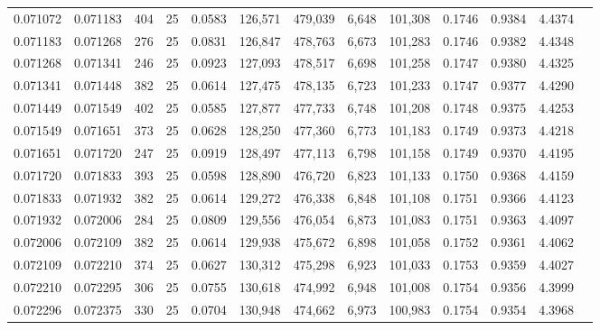 \begin{tabular}{rrrrrrrrrrrrr}
0.071072 & 0.071183 &   404 &  25 &                                     0.0583 & 126,571 & 479,039 &   6,648 & 101,308 & 0.1746 & 0.9384 & 4.4374 \\
0.071183 & 0.071268 &   276 &  25 &                                     0.0831 & 126,847 & 478,763 &   6,673 & 101,283 & 0.1746 & 0.9382 & 4.4348 \\
0.071268 & 0.071341 &   246 &  25 &                                     0.0923 & 127,093 & 478,517 &   6,698 & 101,258 & 0.1747 & 0.9380 & 4.4325 \\
0.071341 & 0.071448 &   382 &  25 &                                     0.0614 & 127,475 & 478,135 &   6,723 & 101,233 & 0.1747 & 0.9377 & 4.4290 \\
0.071449 & 0.071549 &   402 &  25 &                                     0.0585 & 127,877 & 477,733 &   6,748 & 101,208 & 0.1748 & 0.9375 & 4.4253 \\
0.071549 & 0.071651 &   373 &  25 &                                     0.0628 & 128,250 & 477,360 &   6,773 & 101,183 & 0.1749 & 0.9373 & 4.4218 \\
0.071651 & 0.071720 &   247 &  25 &                                     0.0919 & 128,497 & 477,113 &   6,798 & 101,158 & 0.1749 & 0.9370 & 4.4195 \\
0.071720 & 0.071833 &   393 &  25 &                                     0.0598 & 128,890 & 476,720 &   6,823 & 101,133 & 0.1750 & 0.9368 & 4.4159 \\
0.071833 & 0.071932 &   382 &  25 &                                     0.0614 & 129,272 & 476,338 &   6,848 & 101,108 & 0.1751 & 0.9366 & 4.4123 \\
0.071932 & 0.072006 &   284 &  25 &                                     0.0809 & 129,556 & 476,054 &   6,873 & 101,083 & 0.1751 & 0.9363 & 4.4097 \\
0.072006 & 0.072109 &   382 &  25 &                                     0.0614 & 129,938 & 475,672 &   6,898 & 101,058 & 0.1752 & 0.9361 & 4.4062 \\
0.072109 & 0.072210 &   374 &  25 &                                     0.0627 & 130,312 & 475,298 &   6,923 & 101,033 & 0.1753 & 0.9359 & 4.4027 \\
0.072210 & 0.072295 &   306 &  25 &                                     0.0755 & 130,618 & 474,992 &   6,948 & 101,008 & 0.1754 & 0.9356 & 4.3999 \\
0.072296 & 0.072375 &   330 &  25 &                                     0.0704 & 130,948 & 474,662 &   6,973 & 100,983 & 0.1754 & 0.9354 & 4.3968 \\

\end{tabular}
